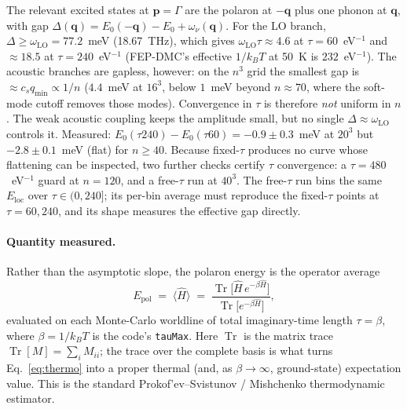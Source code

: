 \documentclass[11pt]{article}
\newcommand{\qv}{\mathbf{q}}
\begin{document}
The relevant excited states at $\mathbf{p}=\Gamma$ are the polaron at $-\qv$ plus one phonon at $\qv$, with gap $\Delta(\qv)=E_{0}(-\qv)-E_{0}+\omega_{\nu}(\qv)$. For the LO branch, $\Delta\ge\omega_{\mathrm{LO}}=77.2$~meV (18.67~THz), which gives $\omega_{\mathrm{LO}}\tau\approx4.6$ at $\tau=60$~eV$^{-1}$ and $\approx18.5$ at $\tau=240$~eV$^{-1}$ (FEP-DMC's effective $1/k_{B}T$ at 50~K is $232$~eV$^{-1}$). The acoustic branches are gapless, however: on the $n^{3}$ grid the smallest gap is $\approx c_{s}q_{\min}\propto1/n$ ($4.4$~meV at $16^{3}$, below $1$~meV beyond $n\approx70$, where the soft-mode cutoff removes those modes). Convergence in $\tau$ is therefore \emph{not} uniform in $n$. The weak acoustic coupling keeps the amplitude small, but no single $\Delta\approx\omega_{\mathrm{LO}}$ controls it. Measured: $E_{0}(\tau240)-E_{0}(\tau60)=-0.9\pm0.3$~meV at $20^{3}$ but $-2.8\pm0.1$~meV (flat) for $n\ge40$. Because fixed-$\tau$ produces no curve whose flattening can be inspected, two further checks certify $\tau$ convergence: a $\tau=480$~eV$^{-1}$ guard at $n=120$, and a free-$\tau$ run at $40^{3}$. The free-$\tau$ run bins the same $E_{\mathrm{loc}}$ over $\tau\in(0,240]$; its per-bin average must reproduce the fixed-$\tau$ points at $\tau=60,240$, and its shape measures the effective gap directly.

\paragraph{Quantity measured.}
Rather than the asymptotic slope, the polaron energy is the operator average
\begin{equation}
  E_{\mathrm{pol}} \;=\; \langle \hat H\rangle
  \;=\; \frac{\operatorname{Tr}\!\bigl[\hat H\,e^{-\beta\hat H}\bigr]}
             {\operatorname{Tr}\!\bigl[e^{-\beta\hat H}\bigr]},
  \label{eq:thermo}
\end{equation}
evaluated on each Monte-Carlo worldline of total imaginary-time length $\tau=\beta$, where $\beta=1/k_{B}T$ is the code's \texttt{tauMax}. Here $\operatorname{Tr}$ is the matrix trace $\operatorname{Tr}[M]=\sum_{i}M_{ii}$; the trace over the complete basis is what turns Eq.~\eqref{eq:thermo} into a proper thermal (and, as $\beta\to\infty$, ground-state) expectation value. This is the standard Prokof'ev--Svistunov / Mishchenko thermodynamic estimator.
\end{document}
